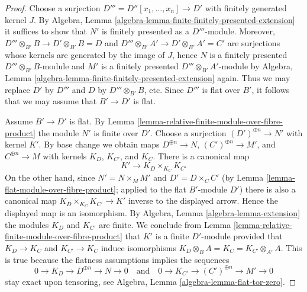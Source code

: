 \begin{proof}
Choose a surjection $D''' = D''[x_1, \ldots, x_n] \to D'$ with
finitely generated kernel $J$.
By Algebra, Lemma \ref{algebra-lemma-finite-finitely-presented-extension}
it suffices to show that $N'$ is finitely presented as a
$D'''$-module. Moreover, $D''' \otimes_{B'} B \to D' \otimes_{B'} B = D$
and $D''' \otimes_{B'} A' \to D' \otimes_{B'} A' = C'$ are surjections
whose kernels are generated by the image of $J$, hence $N$ is a
finitely presented $D''' \otimes_{B'} B$-module and
$M'$ is a finitely presented $D''' \otimes_{B'} A'$-module by
Algebra, Lemma \ref{algebra-lemma-finite-finitely-presented-extension}
again. Thus we may replace $D'$ by $D'''$ and $D$ by
$D''' \otimes_{B'} B$, etc. Since $D'''$ is
flat over $B'$, it follows that we may assume that $B' \to D'$ is flat.

\medskip\noindent
Assume $B' \to D'$ is flat.
By Lemma \ref{lemma-relative-finite-module-over-fibre-product}
the module $N'$ is finite over $D'$. Choose a surjection
$(D')^{\oplus n} \to N'$ with kernel $K'$. By base change we obtain maps
$D^{\oplus n} \to N$, $(C')^{\oplus n} \to M'$, and $C^{\oplus n} \to M$
with kernels $K_D$, $K_{C'}$, and $K_C$. There is a canonical map
$$
K' \longrightarrow K_D \times_{K_C} K_{C'}
$$
On the other hand, since $N' = N \times_M M'$ and
$D' = D \times_C C'$ (by Lemma \ref{lemma-flat-module-over-fibre-product};
applied to the flat $B'$-module $D'$)
there is also a
canonical map $K_D \times_{K_C} K_{C'} \to K'$ inverse to the displayed
arrow. Hence the displayed map is an isomorphism. By
Algebra, Lemma \ref{algebra-lemma-extension}
the modules $K_D$ and $K_{C'}$ are finite. We conclude from
Lemma \ref{lemma-relative-finite-module-over-fibre-product}
that $K'$ is a finite $D'$-module provided that $K_D \to K_C$ and
$K_{C'} \to K_C$ induce isomorphisms
$K_D \otimes_B A = K_C = K_{C'} \otimes_{A'} A$.
This is true because the flatness assumptions implies the sequences
$$
0 \to K_D \to D^{\oplus n} \to N \to 0
\quad\text{and}\quad
0 \to K_{C'} \to (C')^{\oplus n} \to M' \to 0
$$
stay exact upon tensoring, see
Algebra, Lemma \ref{algebra-lemma-flat-tor-zero}.
\end{proof}

